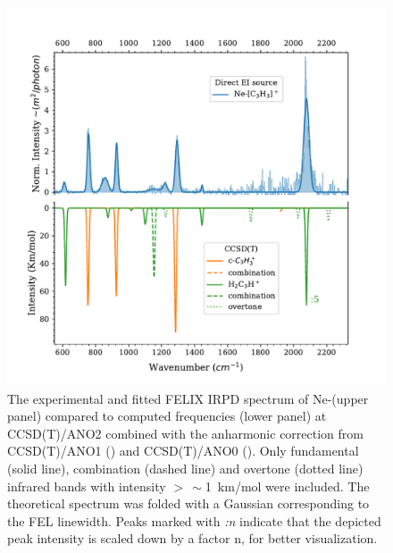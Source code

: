 \begin{figure}

	\centering
	\includegraphics[width=1\textwidth]{chapters/C3H3+ and C3D3+/figures/felix_c3h3+.pdf}
	\caption{The experimental and fitted FELIX IRPD spectrum of Ne-\iso (upper panel) compared to computed frequencies (lower panel) at CCSD(T)/ANO2 combined with the anharmonic correction from CCSD(T)/ANO1 (\linn) and CCSD(T)/ANO0 (\cycn). Only fundamental  (solid line), combination (dashed line) and overtone (dotted line) infrared bands with intensity  $>\, \sim$1~km/mol were included. The theoretical spectrum was folded with a Gaussian corresponding to the FEL linewidth. Peaks marked with \textit{:n} indicate that the depicted peak intensity is scaled down by a factor n, for better visualization.}
	\label{FIG:felix}
\end{figure}

